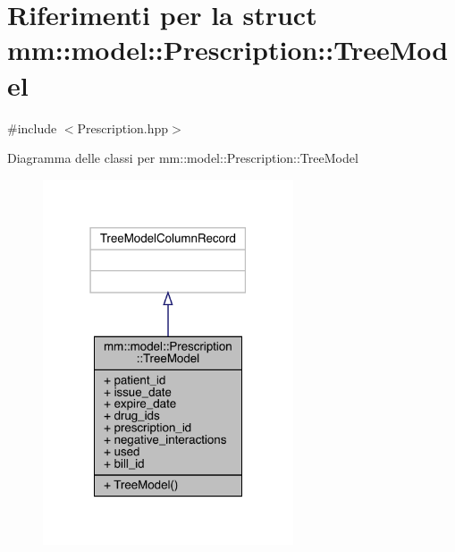 \hypertarget{structmm_1_1model_1_1_prescription_1_1_tree_model}{}\section{Riferimenti per la struct mm\+:\+:model\+:\+:Prescription\+:\+:Tree\+Model}
\label{structmm_1_1model_1_1_prescription_1_1_tree_model}


{\ttfamily \#include $<$Prescription.\+hpp$>$}



Diagramma delle classi per mm\+:\+:model\+:\+:Prescription\+:\+:Tree\+Model
\nopagebreak
\begin{figure}[H]
\begin{center}
\leavevmode
\includegraphics[width=210pt]{d8/d20/structmm_1_1model_1_1_prescription_1_1_tree_model__inherit__graph}
\end{center}
\end{figure}


